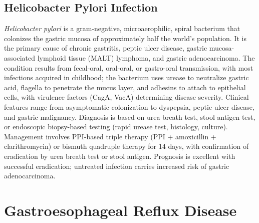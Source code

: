 \subsection{Helicobacter Pylori Infection}
\label{sec:Helicobacter Pylori Infection}
\textit{Helicobacter pylori} is a gram-negative, microaerophilic, spiral bacterium that colonizes the gastric mucosa of approximately half the world's population. It is the primary cause of chronic gastritis, peptic ulcer disease, gastric mucosa-associated lymphoid tissue (MALT) lymphoma, and gastric adenocarcinoma. The condition results from fecal-oral, oral-oral, or gastro-oral transmission, with most infections acquired in childhood; the bacterium uses urease to neutralize gastric acid, flagella to penetrate the mucus layer, and adhesins to attach to epithelial cells, with virulence factors (CagA, VacA) determining disease severity. Clinical features range from asymptomatic colonization to dyspepsia, peptic ulcer disease, and gastric malignancy. Diagnosis is based on urea breath test, stool antigen test, or endoscopic biopsy-based testing (rapid urease test, histology, culture). Management involves PPI-based triple therapy (PPI + amoxicillin + clarithromycin) or bismuth quadruple therapy for 14 days, with confirmation of eradication by urea breath test or stool antigen. Prognosis is excellent with successful eradication; untreated infection carries increased risk of gastric adenocarcinoma.

\section{Gastroesophageal Reflux Disease}








